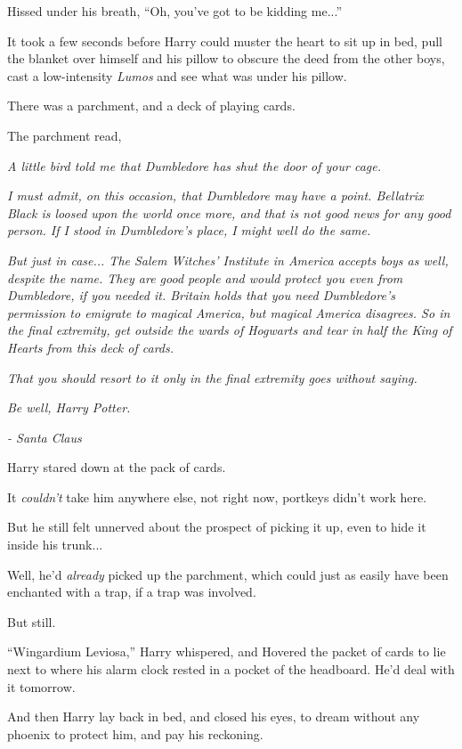 Hissed under his breath, ``Oh, you've got to be kidding me...''

It took a few seconds before Harry could muster the heart to sit up in bed, pull the blanket over himself and his pillow to obscure the deed from the other boys, cast a low-intensity \emph{Lumos} and see what was under his pillow.

There was a parchment, and a deck of playing cards.

The parchment read,

\emph{A little bird told me that Dumbledore has shut the door of your cage.}

\emph{I must admit, on this occasion, that Dumbledore may have a point. Bellatrix Black is loosed upon the world once more, and that is not good news for any good person. If I stood in Dumbledore's place, I might well do the same.}

\emph{But just in case... The Salem Witches' Institute in America accepts boys as well, despite the name. They are good people and would protect you even from Dumbledore, if you needed it. Britain holds that you need Dumbledore's permission to emigrate to magical America, but magical America disagrees. So in the final extremity, get outside the wards of Hogwarts and tear in half the King of Hearts from this deck of cards.}

\emph{That you should resort to it only in the final extremity goes without saying.}

\emph{Be well, Harry Potter.}

\emph{- Santa Claus}

Harry stared down at the pack of cards.

It \emph{couldn't} take him anywhere else, not right now, portkeys didn't work here.

But he still felt unnerved about the prospect of picking it up, even to hide it inside his trunk...

Well, he'd \emph{already} picked up the parchment, which could just as easily have been enchanted with a trap, if a trap was involved.

But still.

``Wingardium Leviosa,'' Harry whispered, and Hovered the packet of cards to lie next to where his alarm clock rested in a pocket of the headboard. He'd deal with it tomorrow.

And then Harry lay back in bed, and closed his eyes, to dream without any phoenix to protect him, and pay his reckoning.

